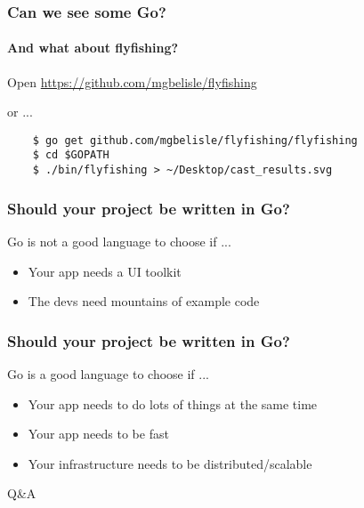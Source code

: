 \documentclass{beamer}
\begin{document}
\begin{frame}[fragile]
  \frametitle{Can we see some Go?}
  \framesubtitle{And what about flyfishing?}
  \begin{center}
    Open \url{https://github.com/mgbelisle/flyfishing}
    \bigskip

    or ...
  \end{center}  
  \begin{verbatim}
    $ go get github.com/mgbelisle/flyfishing/flyfishing
    $ cd $GOPATH
    $ ./bin/flyfishing > ~/Desktop/cast_results.svg
  \end{verbatim}
\end{frame}
\begin{frame}
  \frametitle{Should your project be written in Go?}
  Go is not a good language to choose if ...
  \begin{itemize}
    \item Your app needs a UI toolkit
    \item The devs need mountains of example code
  \end{itemize}
\end{frame}
\begin{frame}
  \frametitle{Should your project be written in Go?}
  Go is a good language to choose if ...
  \begin{itemize}
    \item Your app needs to do lots of things at the same time
    \item Your app needs to be fast
    \item Your infrastructure needs to be distributed/scalable
  \end{itemize}
\end{frame}
\begin{frame}
  \begin{center}
    {\huge Q\&A}
  \end{center}
\end{frame}
\end{document}
